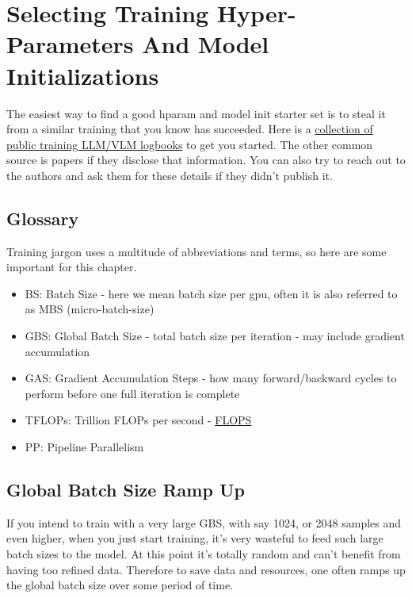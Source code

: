 \documentclass[
]{report}
\author{}
\date{2024-02-13}
\providecommand{\tightlist}{%
  \setlength{\itemsep}{0pt}\setlength{\parskip}{0pt}}\usepackage{longtable,booktabs,array}
\begin{document}
\chapter{Selecting Training Hyper-Parameters And Model
Initializations}\label{selecting-training-hyper-parameters-and-model-initializations}

The easiest way to find a good hparam and model init starter set is to
steal it from a similar training that you know has succeeded. Here is a
\href{../resources/README.md\#publicly-available-training-llmvlm-logbooks}{collection
of public training LLM/VLM logbooks} to get you started. The other
common source is papers if they disclose that information. You can also
try to reach out to the authors and ask them for these details if they
didn't publish it.

\section{Glossary}\label{glossary}

Training jargon uses a multitude of abbreviations and terms, so here are
some important for this chapter.

\begin{itemize}
\tightlist
\item
  BS: Batch Size - here we mean batch size per gpu, often it is also
  referred to as MBS (micro-batch-size)
\item
  GBS: Global Batch Size - total batch size per iteration - may include
  gradient accumulation
\item
  GAS: Gradient Accumulation Steps - how many forward/backward cycles to
  perform before one full iteration is complete
\item
  TFLOPs: Trillion FLOPs per second -
  \href{https://en.wikipedia.org/wiki/FLOPS}{FLOPS}
\item
  PP: Pipeline Parallelism
\end{itemize}

\section{Global Batch Size Ramp Up}\label{global-batch-size-ramp-up}

If you intend to train with a very large GBS, with say 1024, or 2048
samples and even higher, when you just start training, it's very
wasteful to feed such large batch sizes to the model. At this point it's
totally random and can't benefit from having too refined data. Therefore
to save data and resources, one often ramps up the global batch size
over some period of time.
\end{document}
